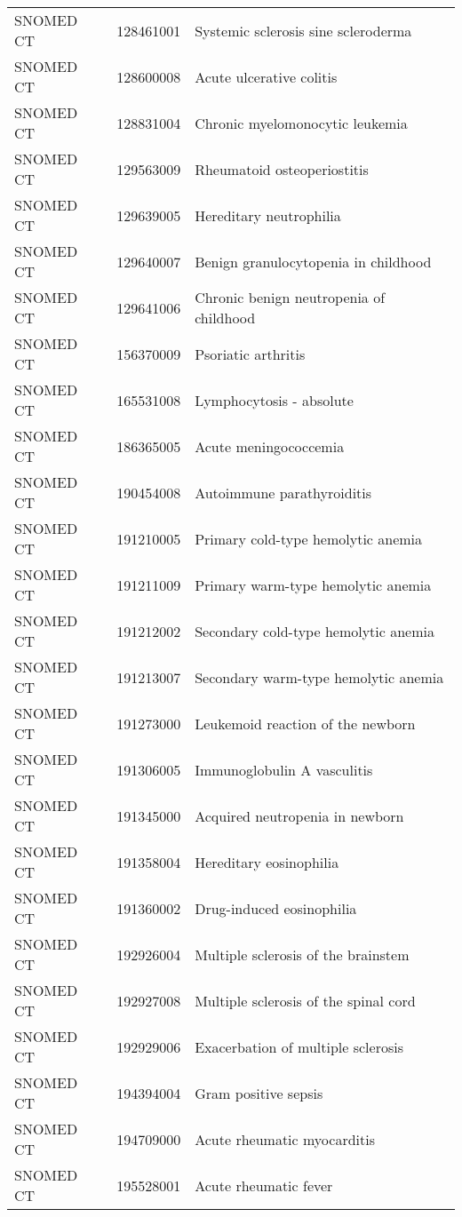 \begin{longtable}{p{}p{}p{}}
  SNOMED CT & 128461001 & Systemic sclerosis sine scleroderma \\ 
  SNOMED CT & 128600008 & Acute ulcerative colitis \\ 
  SNOMED CT & 128831004 & Chronic myelomonocytic leukemia \\ 
  SNOMED CT & 129563009 & Rheumatoid osteoperiostitis \\ 
  SNOMED CT & 129639005 & Hereditary neutrophilia \\ 
  SNOMED CT & 129640007 & Benign granulocytopenia in childhood \\ 
  SNOMED CT & 129641006 & Chronic benign neutropenia of childhood \\ 
  SNOMED CT & 156370009 & Psoriatic arthritis \\ 
  SNOMED CT & 165531008 & Lymphocytosis - absolute \\ 
  SNOMED CT & 186365005 & Acute meningococcemia \\ 
  SNOMED CT & 190454008 & Autoimmune parathyroiditis \\ 
  SNOMED CT & 191210005 & Primary cold-type hemolytic anemia \\ 
  SNOMED CT & 191211009 & Primary warm-type hemolytic anemia \\ 
  SNOMED CT & 191212002 & Secondary cold-type hemolytic anemia \\ 
  SNOMED CT & 191213007 & Secondary warm-type hemolytic anemia \\ 
  SNOMED CT & 191273000 & Leukemoid reaction of the newborn \\ 
  SNOMED CT & 191306005 & Immunoglobulin A vasculitis \\ 
  SNOMED CT & 191345000 & Acquired neutropenia in newborn \\ 
  SNOMED CT & 191358004 & Hereditary eosinophilia \\ 
  SNOMED CT & 191360002 & Drug-induced eosinophilia \\ 
  SNOMED CT & 192926004 & Multiple sclerosis of the brainstem \\ 
  SNOMED CT & 192927008 & Multiple sclerosis of the spinal cord \\ 
  SNOMED CT & 192929006 & Exacerbation of multiple sclerosis \\ 
  SNOMED CT & 194394004 & Gram positive sepsis \\ 
  SNOMED CT & 194709000 & Acute rheumatic myocarditis \\ 
  SNOMED CT & 195528001 & Acute rheumatic fever \\ 

\end{longtable}
